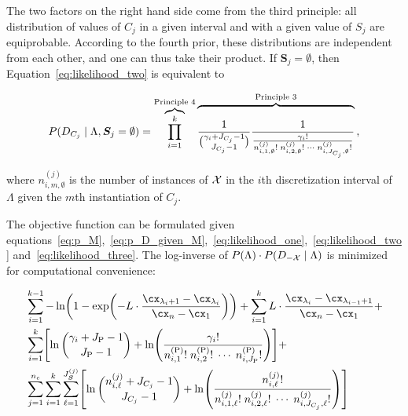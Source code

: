 The two factors on the right hand side come from the third principle: all distribution of values of $C_j$ in a given interval and with a given value of $S_j$ are equiprobable.
According to the fourth prior, these distributions are independent from each other, and one can thus take their product.
If $\bm{S}_j = \emptyset$, then Equation~\ref{eq:likelihood_two} is equivalent to

\begin{equation}
  \label{eq:likelihood_three}
  P(D_{C_j} \mid \Lambda, \bm{S}_j = \emptyset) =
  \overbrace{\prod_{i=1}^{k}}^{\text{Principle 4}}
  \overbrace{\rule{0pt}{2.3em}{
    {1}\over{
      {\gamma_i + J_{C_j} - 1}\choose{J_{C_j}-1}}
    }
    {{1}\over{
      {{\gamma_i}!} \over {
        {n^{(j)}_{i,1,\emptyset}!} \; {n^{(j)}_{i,2,\emptyset}!} \; \cdots \; {n^{(j)}_{i,J_{C_j},\emptyset} !}
      }
    }
  }}^{\text{Principle 3}}
  \text{,}
\end{equation}

\noindent
where $n^{(j)}_{i,m,\emptyset}$ is the number of instances of $\mathcal{X}$ in the $i$th discretization interval of $\Lambda$ given the $m$th instantiation of $C_j$.

The objective function can be formulated given equations~\ref{eq:p_M},~\ref{eq:p_D_given_M},~\ref{eq:likelihood_one},~\ref{eq:likelihood_two} and~\ref{eq:likelihood_three}.
The log-inverse of $P(\Lambda) \cdot P(D_{-\mathcal{X}} \mid \Lambda)$ is minimized for computational convenience:

\begin{equation}
\label{eq:opt_prob}
\begin{aligned}
  & \sum_{i=1}^{k-1}
   - \ln
    \paren{
      1 - \exp
      \paren{
        - L \cdot  \frac{
                         \cx_{\lambda_i +1} - \cx_{\lambda_i}
                       }{
                         \cx_n - \cx_1
                        }
      }
    }
      + \sum_{i=1}^{k}
      L \cdot \frac{\cx_{\lambda_{i}} - \cx_{\lambda_{i-1} + 1}}{\cx_n - \cx_1} + \\
  & \sum_{i=1}^{k} \brock{
  \ln{{\gamma_i + J_\text{P} - 1}\choose{J_\text{P} - 1}}
  +{ \ln \paren{
        \frac{
          {\gamma_i}!
        }{
          {n^{(\text{P})}_{i,1}}! \; {n^{(\text{P})}_{i,2}}! \; \cdots \; {n^{(\text{P})}_{i,J_\text{P}}}!
        }
      }}
  } + \\
  & \sum_{j=1}^{n_c} \sum_{i=1}^k \sum_{\ell=1}^{J^{(j)}_{\bm{S}}} \brock{
  { \ln
          {{n^{(j)}_{i,\ell} + J_{C_j} - 1}\choose{J_{C_j}-1}}}
    +
    \ln \paren{ {
          \frac{
            {n^{(j)}_{i,\ell}}!
          }{
            {n^{(j)}_{i,1,\ell}!} \; {n^{(j)}_{i,2,\ell}!} \; \cdots \; {n^{(j)}_{i,J_{C_j},\ell}!}
          }
        }
        } }
\end{aligned}
\end{equation}

